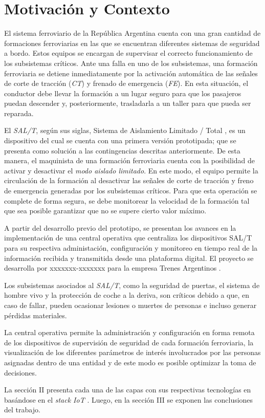 
\section{Motivación y Contexto}

El sistema ferroviario de la República Argentina cuenta con una gran cantidad de formaciones ferroviarias en las que se encuentran diferentes sistemas de seguridad a bordo. Estos equipos se encargan de supervisar el correcto funcionamiento de los subsistemas críticos. Ante una falla en uno de los subsistemas, una formación ferroviaria se detiene inmediatamente por la activación automática de las señales de corte de tracción (\textit{CT}) y frenado de emergencia (\textit{FE}). En esta situación, el conductor debe llevar la formación a un lugar seguro para que los pasajeros puedan descender y, posteriormente, trasladarla a un taller para que pueda ser reparada.

El \textit{SAL/T}, según sus siglas, Sistema de Aislamiento Limitado / Total \cite{b1}, es un dispositivo del cual se cuenta con una primera versión prototipada; que se presenta como solución a las contingencias descritas anteriormente. De esta manera, el maquinista de una formación ferroviaria cuenta con la posibilidad de activar y desactivar el \textit{modo aislado limitado}. En este modo, el equipo permite la circulación de la formación al desactivar las señales de corte de tracción y freno de emergencia generadas por los subsistemas críticos. Para que esta operación se complete de forma segura, se debe monitorear la velocidad de la formación tal que sea posible garantizar que no se supere cierto valor máximo.

A partir del desarrollo previo del prototipo, se presentan los avances en la implementación de una central operativa que centraliza los dispositivos SAL/T para su respectiva administación, configuración y monitoreo en tiempo real de la información recibida y transmitida desde una plataforma digital. El proyecto se desarrolla por xxxxxxx-xxxxxxx \cite{b2} para la empresa Trenes Argentinos \cite{b3}.

Los subsistemas asociados al \textit{SAL/T}, como la seguridad de puertas, el sistema de hombre vivo y la protección de coche a la deriva, son críticos debido a que, en caso de fallar, pueden ocasionar lesiones o muertes de personas e incluso generar pérdidas materiales. 

La central operativa permite la administración y configuración en forma remota de los dispositivos de supervisión de seguridad de cada formación ferroviaria, la visualización de los diferentes parámetros de interés involucrados por las personas asignadas dentro de una entidad y de este modo es posible optimizar la toma de decisiones. 

La sección II presenta cada una de las capas con sus respectivas tecnologías en basándose en el \textit{stack IoT} \cite{b4}. Luego, en la sección III se exponen las conclusiones del trabajo.


